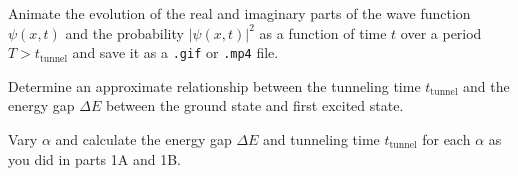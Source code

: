 \begin{solution}
\end{solution}

\begin{problem}[10]
Animate the evolution of the real and imaginary parts of the wave function $\psi(x, t)$ and the probability $|\psi(x, t)|^2$ as a function of time $t$ over a period $T > t_\mathrm{tunnel}$ and save it as a \texttt{.gif} or \texttt{.mp4} file.
\end{problem}

\begin{solution}
\end{solution}

\begin{problem}[10]
Determine an approximate relationship between the tunneling time $t_\mathrm{tunnel}$ and the energy gap $\Delta E$ between the ground state and first excited state.

\begin{hint}
  Vary $\alpha$ and calculate the energy gap $\Delta E$ and tunneling time $t_\mathrm{tunnel}$ for each $\alpha$ as you did in parts 1A and 1B.
\end{hint}

\end{problem}

\begin{solution}
\end{solution}


